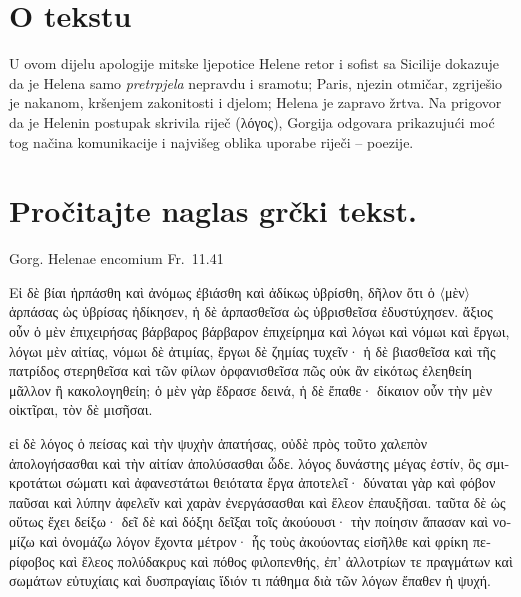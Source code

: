 


\section*{O tekstu}

U ovom dijelu apologije mitske ljepotice Helene retor i sofist sa Sicilije dokazuje da je Helena samo \textit{pretrpjela} nepravdu i sramotu; Paris, njezin otmičar, zgriješio je nakanom, kršenjem zakonitosti i djelom; Helena je zapravo žrtva. Na prigovor da je Helenin postupak skrivila riječ (λόγος), Gorgija odgovara prikazujući moć tog načina komunikacije i najvišeg oblika uporabe riječi – poezije.


\section*{Pročitajte naglas grčki tekst.}
Gorg. Helenae encomium Fr.\ 11.41

\medskip

{\large
\begin{greek}
\noindent Εἰ δὲ βίαι ἡρπάσθη καὶ ἀνόμως ἐβιάσθη καὶ ἀδίκως ὑβρίσθη, δῆλον ὅτι ὁ $\langle$μὲν$\rangle$ ἁρπάσας ὡς ὑβρίσας ἠδίκησεν, ἡ δὲ ἁρπασθεῖσα ὡς ὑβρισθεῖσα ἐδυστύχησεν. ἄξιος οὖν ὁ μὲν ἐπιχειρήσας βάρβαρος βάρβαρον ἐπιχείρημα καὶ λόγωι καὶ νόμωι καὶ ἔργωι, λόγωι μὲν αἰτίας, νόμωι δὲ ἀτιμίας, ἔργωι δὲ ζημίας τυχεῖν· ἡ δὲ βιασθεῖσα καὶ τῆς πατρίδος στερηθεῖσα καὶ τῶν φίλων ὀρφανισθεῖσα πῶς οὐκ ἂν εἰκότως ἐλεηθείη μᾶλλον ἢ κακολογηθείη; ὁ μὲν γὰρ ἔδρασε δεινά, ἡ δὲ ἔπαθε· δίκαιον οὖν τὴν μὲν οἰκτῖραι, τὸν δὲ μισῆσαι. 

εἰ δὲ λόγος ὁ πείσας καὶ τὴν ψυχὴν ἀπατήσας, οὐδὲ πρὸς τοῦτο χαλεπὸν ἀπολογήσασθαι καὶ τὴν αἰτίαν ἀπολύσασθαι ὧδε. λόγος δυνάστης μέγας ἐστίν, ὃς σμικροτάτωι σώματι καὶ ἀφανεστάτωι θειότατα ἔργα ἀποτελεῖ· δύναται γὰρ καὶ φόβον παῦσαι καὶ λύπην ἀφελεῖν καὶ χαρὰν ἐνεργάσασθαι καὶ ἔλεον ἐπαυξῆσαι. ταῦτα δὲ ὡς οὕτως ἔχει δείξω· δεῖ δὲ καὶ δόξηι δεῖξαι τοῖς ἀκούουσι· τὴν ποίησιν ἅπασαν καὶ νομίζω καὶ ὀνομάζω λόγον ἔχοντα μέτρον· ἧς τοὺς ἀκούοντας εἰσῆλθε καὶ φρίκη περίφοβος καὶ ἔλεος πολύδακρυς καὶ πόθος φιλοπενθής, ἐπ' ἀλλοτρίων τε πραγμάτων καὶ σωμάτων εὐτυχίαις καὶ δυσπραγίαις ἴδιόν τι πάθημα διὰ τῶν λόγων ἔπαθεν ἡ ψυχή.

\end{greek}

}

